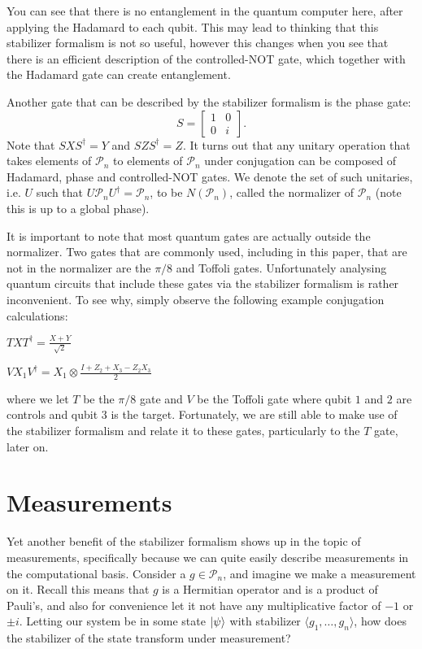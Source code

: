 \documentclass[12pt]{dalthesis}
\begin{document}
You can see that there is no entanglement in the quantum computer here, after applying the Hadamard to each qubit. This may lead to thinking that this stabilizer formalism is not so useful, however this changes when you see that there is an efficient description of the controlled-NOT gate, which together with the Hadamard gate can create entanglement. 

Another gate that can be described by the stabilizer formalism is the phase gate: 
\begin{equation}
S = 
\begin{bmatrix}
1 & 0 \\
0 & i
\end{bmatrix}.
\end{equation}
Note that $SXS^{\dag} = Y$ and $SZS^{\dag} = Z$. It turns out that any unitary operation that takes elements of $\mathcal{P}_n$ to elements of $\mathcal{P}_n$ under conjugation can be composed of Hadamard, phase and controlled-NOT gates. We denote the set of such unitaries, i.e. $U$ such that $U\mathcal{P}_nU^{\dag} = \mathcal{P}_n$, to be $N(\mathcal{P}_n)$, called the normalizer of $\mathcal{P}_n$ (note this is up to a global phase). 

It is important to note that most quantum gates are actually outside the normalizer. Two gates that are commonly used, including in this paper, that are not in the normalizer are the $\pi /8$ and Toffoli gates. Unfortunately analysing quantum circuits that include these gates via the stabilizer formalism is rather inconvenient. To see why, simply observe the following example conjugation calculations:
\begin{center}
$TXT^{\dag} = \frac{X+Y}{\sqrt{2}}$
\end{center}
\begin{center}
$VX_1V^{\dag} = X_1 \otimes \frac{I + Z_2 +X_3 -Z_2X_3}{2}$
\end{center}
where we let $T$ be the $\pi /8$ gate and $V$ be the Toffoli gate where qubit $1$ and $2$ are controls and qubit $3$ is the target. Fortunately, we are still able to make use of the stabilizer formalism and relate it to these gates, particularly to the $T$ gate, later on.

\section{Measurements}
Yet another benefit of the stabilizer formalism shows up in the topic of measurements, specifically because we can quite easily describe measurements in the computational basis. Consider a $g \in \mathcal{P}_n$, and imagine we make a measurement on it. Recall this means that $g$ is a Hermitian operator and is a product of Pauli's, and also for convenience let it not have any multiplicative factor of $-1$ or $\pm i$. Letting our system be in some state $\ket{\psi}$ with stabilizer $\langle g_1, \dots , g_n \rangle $, how does the stabilizer of the state transform under measurement? 
\end{document}
